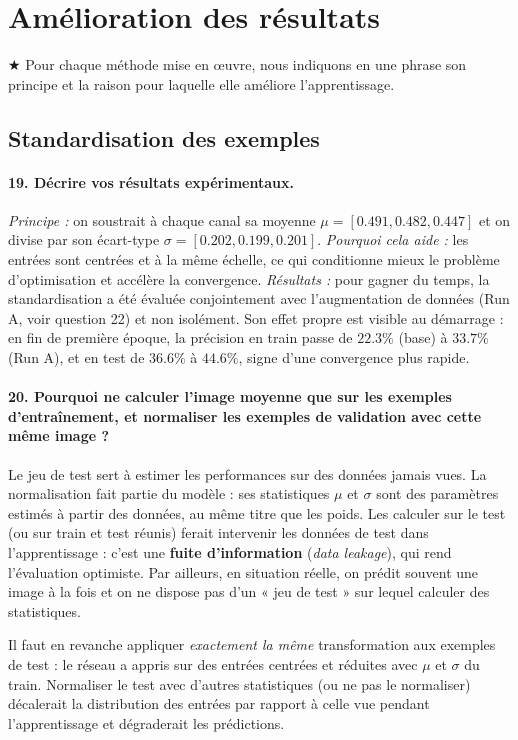 \documentclass{report}
\begin{document}
\section{Amélioration des résultats}

$\bigstar$ Pour chaque méthode mise en œuvre, nous indiquons en une phrase son principe et la raison pour laquelle elle améliore l'apprentissage.

\subsection{Standardisation des exemples}

\paragraph{19. Décrire vos résultats expérimentaux.}
 \textit{Principe :} on soustrait à chaque canal sa moyenne $\mu = [0.491, 0.482, 0.447]$ et on divise par son écart-type $\sigma = [0.202, 0.199, 0.201]$. \textit{Pourquoi cela aide :} les entrées sont centrées et à la même échelle, ce qui conditionne mieux le problème d'optimisation et accélère la convergence. \textit{Résultats :} pour gagner du temps, la standardisation a été évaluée conjointement avec l'augmentation de données (Run A, voir question 22) et non isolément. Son effet propre est visible au démarrage : en fin de première époque, la précision en train passe de $22.3\%$ (base) à $33.7\%$ (Run A), et en test de $36.6\%$ à $44.6\%$, signe d'une convergence plus rapide.

\paragraph{20. Pourquoi ne calculer l'image moyenne que sur les exemples d'entraînement, et normaliser les exemples de validation avec cette même image ?}
 Le jeu de test sert à estimer les performances sur des données jamais vues. La normalisation fait partie du modèle : ses statistiques $\mu$ et $\sigma$ sont des paramètres estimés à partir des données, au même titre que les poids. Les calculer sur le test (ou sur train et test réunis) ferait intervenir les données de test dans l'apprentissage : c'est une \textbf{fuite d'information} (\textit{data leakage}), qui rend l'évaluation optimiste. Par ailleurs, en situation réelle, on prédit souvent une image à la fois et on ne dispose pas d'un « jeu de test » sur lequel calculer des statistiques.

Il faut en revanche appliquer \textit{exactement la même} transformation aux exemples de test : le réseau a appris sur des entrées centrées et réduites avec $\mu$ et $\sigma$ du train. Normaliser le test avec d'autres statistiques (ou ne pas le normaliser) décalerait la distribution des entrées par rapport à celle vue pendant l'apprentissage et dégraderait les prédictions.
\end{document}
